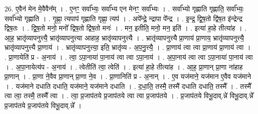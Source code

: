 \documentclass[17pt]{extarticle}
\begin{document}
26. ए॒वैन॑ मेन मे॒वैवैन᳚म् । . ए॒नꣳ॒॒ सर्वा᳚भ्यः॒ सर्वा᳚भ्य एन मेनꣳ॒॒ सर्वा᳚भ्यः । . सर्वा᳚भ्यो गृह्णाति गृह्णाति॒ सर्वा᳚भ्यः॒ सर्वा᳚भ्यो गृह्णाति । . गृ॒ह्णा॒ त्यपाप॑ गृह्णाति गृह्णा॒ त्यप॑ । . अपे᳚न्द्रे॒ न्द्रापा पे᳚न्द्र । . इ॒न्द्र॒ द्वि॒ष॒तो द्वि॑ष॒त इ॑न्द्रेन्द्र द्विष॒तः । . द्वि॒ष॒तो मनो॒ मनो᳚ द्विष॒तो द्वि॑ष॒तो मनः॑ । . मन॒ इतीति॒ मनो॒ मन॒ इति॑ । . इत्या॑ हा॒हे तीत्या॑ह । . आ॒ह॒ भ्रातृ॑व्यापनुत्त्यै॒ भ्रातृ॑व्यापनुत्त्या आहाह॒ भ्रातृ॑व्यापनुत्त्यै । . भ्रातृ॑व्यापनुत्त्यै प्रा॒णाय॑ प्रा॒णाय॒ भ्रातृ॑व्यापनुत्त्यै॒ भ्रातृ॑व्यापनुत्त्यै प्रा॒णाय॑ । . भ्रातृ॑व्यापनुत्त्या॒ इति॒ भ्रातृ॑व्य - अ॒प॒नु॒त्त्यै॒ । . प्रा॒णाय॑ त्वा त्वा प्रा॒णाय॑ प्रा॒णाय॑ त्वा । . प्रा॒णायेति॑ प्र - अ॒नाय॑ । . त्वा॒ ऽपा॒नाया॑ पा॒नाय॑ त्वा त्वा ऽपा॒नाय॑ । . अ॒पा॒नाय॑ त्वा त्वा ऽपा॒नाया॑ पा॒नाय॑ त्वा । . अ॒पा॒नायेत्य॑प - अ॒नाय॑ । . त्वेतीति॑ त्वा॒ त्वेति॑ । . इत्या॑ हा॒हे तीत्या॑ह । . आ॒ह॒ प्रा॒णान् प्रा॒णा ना॑हाह प्रा॒णान् । . प्रा॒णा ने॒वैव प्रा॒णान् प्रा॒णा ने॒व । . प्रा॒णानिति॑ प्र - अ॒नान् । . ए॒व यज॑माने॒ यज॑मान ए॒वैव यज॑माने । . यज॑माने दधाति दधाति॒ यज॑माने॒ यज॑माने दधाति । . द॒धा॒ति॒ तस्मै॒ तस्मै॑ दधाति दधाति॒ तस्मै᳚ । . तस्मै᳚ त्वा त्वा॒ तस्मै॒ तस्मै᳚ त्वा । . त्वा॒ प्र॒जाप॑तये प्र॒जाप॑तये त्वा त्वा प्र॒जाप॑तये । . प्र॒जाप॑तये विभू॒दाव्.न्ने॑ विभू॒दाव्.न्ने᳚ प्र॒जाप॑तये प्र॒जाप॑तये विभू॒दाव्.न्ने᳚ । \newline
\end{document}
